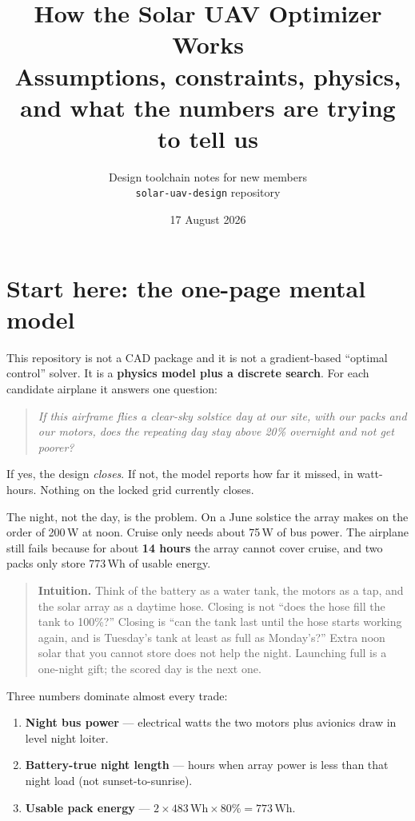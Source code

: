 \documentclass[11pt,letterpaper]{article}
\title{\textbf{How the Solar UAV Optimizer Works}\\[0.4em]
\large Assumptions, constraints, physics, and what the numbers are trying to tell us}
\author{Design toolchain notes for new members\\
\texttt{solar-uav-design} repository}
\date{17 August 2026}
\newenvironment{intuition}{\begin{quote}\small}{\end{quote}}
\begin{document}
\maketitle
\tableofcontents
\listoffigures
\newpage

\section{Start here: the one-page mental model}

This repository is not a CAD package and it is not a gradient-based ``optimal control'' solver.
It is a \textbf{physics model plus a discrete search}. For each candidate airplane it answers one question:

\begin{quote}
\textit{If this airframe flies a clear-sky solstice day at our site, with our packs and our motors, does the repeating day stay above 20\% overnight and not get poorer?}
\end{quote}

If yes, the design \emph{closes}. If not, the model reports how far it missed, in watt-hours. Nothing on the locked grid currently closes.

The night, not the day, is the problem. On a June solstice the array makes on the order of 200\,W at noon. Cruise only needs about 75\,W of bus power. The airplane still fails because for about \textbf{14 hours} the array cannot cover cruise, and two packs only store 773\,Wh of usable energy.

\begin{intuition}
\textbf{Intuition.} Think of the battery as a water tank, the motors as a tap, and the solar array as a daytime hose. Closing is not ``does the hose fill the tank to 100\%?'' Closing is ``can the tank last until the hose starts working again, and is Tuesday's tank at least as full as Monday's?'' Extra noon solar that you cannot store does not help the night. Launching full is a one-night gift; the scored day is the next one.
\end{intuition}

Three numbers dominate almost every trade:

\begin{enumerate}
  \item \textbf{Night bus power} --- electrical watts the two motors plus avionics draw in level night loiter.
  \item \textbf{Battery-true night length} --- hours when array power is less than that night load (not sunset-to-sunrise).
  \item \textbf{Usable pack energy} --- $2 \times 483\,\mathrm{Wh} \times 80\% = 773\,\mathrm{Wh}$.
\end{enumerate}
\end{document}
